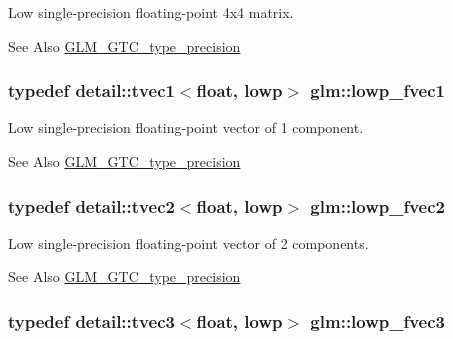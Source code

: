Low single-\/precision floating-\/point 4x4 matrix. \begin{DoxySeeAlso}{See Also}
\hyperlink{group__gtc__type__precision}{G\-L\-M\-\_\-\-G\-T\-C\-\_\-type\-\_\-precision} 
\end{DoxySeeAlso}
\hypertarget{group__gtc__type__precision_gad5266f0507395cf8cdfe84b9cf5496e4}{
\subsubsection[{lowp\-\_\-fvec1}]{\setlength{\rightskip}{0pt plus 5cm}typedef detail\-::tvec1$<$float, lowp$>$ {\bf glm\-::lowp\-\_\-fvec1}}}\label{group__gtc__type__precision_gad5266f0507395cf8cdfe84b9cf5496e4}
Low single-\/precision floating-\/point vector of 1 component. \begin{DoxySeeAlso}{See Also}
\hyperlink{group__gtc__type__precision}{G\-L\-M\-\_\-\-G\-T\-C\-\_\-type\-\_\-precision} 
\end{DoxySeeAlso}
\hypertarget{group__gtc__type__precision_gaf365442c52322b810bc0ed943e539229}{
\subsubsection[{lowp\-\_\-fvec2}]{\setlength{\rightskip}{0pt plus 5cm}typedef detail\-::tvec2$<$float, lowp$>$ {\bf glm\-::lowp\-\_\-fvec2}}}\label{group__gtc__type__precision_gaf365442c52322b810bc0ed943e539229}
Low single-\/precision floating-\/point vector of 2 components. \begin{DoxySeeAlso}{See Also}
\hyperlink{group__gtc__type__precision}{G\-L\-M\-\_\-\-G\-T\-C\-\_\-type\-\_\-precision} 
\end{DoxySeeAlso}
\hypertarget{group__gtc__type__precision_ga83d77dfe136d4add9e214cd205320c12}{
\subsubsection[{lowp\-\_\-fvec3}]{\setlength{\rightskip}{0pt plus 5cm}typedef detail\-::tvec3$<$float, lowp$>$ {\bf glm\-::lowp\-\_\-fvec3}}}\label{group__gtc__type__precision_ga83d77dfe136d4add9e214cd205320c12}
